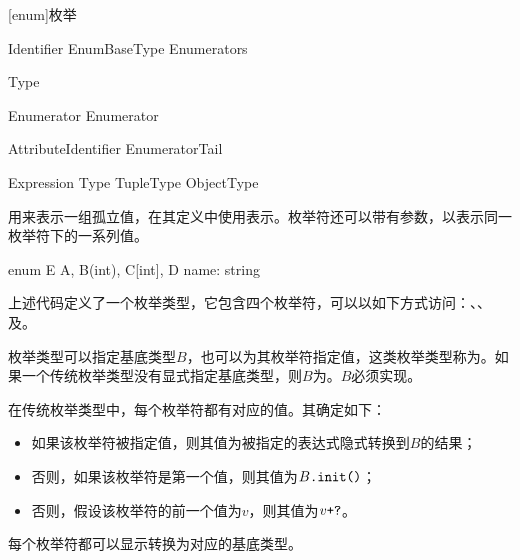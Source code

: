 
[enum]{枚举}

\begin{bnf}
 \br
     Identifier EnumBaseType\bnfq \terminal{\{} Enumerators \terminal{\}}
\end{bnf}

\begin{bnf}
 \br
    \terminal{:} Type
\end{bnf}

\begin{bnf}
 \br
    Enumerator \bnflp \terminal{,} Enumerator \bnfrp\bnfs \terminal{,}\bnfq
\end{bnf}

\begin{bnf}
 \br
    Attribute\bnfq Identifier EnumeratorTail\bnfq
\end{bnf}

\begin{bnf}
 \br
    \terminal{=} Expression \br
    \terminal{[} Type \terminal{]} \br
    TupleType \br
    ObjectType \br
\end{bnf}

\pnum
{}用来表示一组孤立值，在其定义中使用表示。枚举符还可以带有参数，以表示同一枚举符下的一系列值。

\enterexample
\begin{codeblock}

enum E {
    A,
    B(int),
    C[int],
    D{ name: string }
}

\end{codeblock}

上述代码定义了一个枚举类型，它包含四个枚举符，可以以如下方式访问：、、及。
\exitexample

\pnum
枚举类型可以指定基底类型$B$，也可以为其枚举符指定值，这类枚举类型称为。如果一个传统枚举类型没有显式指定基底类型，则$B$为。$B$必须实现。

\pnum
在传统枚举类型中，每个枚举符都有对应的值。其确定如下：

\begin{itemize}
    \item 如果该枚举符被指定值，则其值为被指定的表达式隐式转换到$B$的结果；
    \item 否则，如果该枚举符是第一个值，则其值为$B\texttt{.init()}$；
    \item 否则，假设该枚举符的前一个值为$v$，则其值为$v\texttt{+?}$。
\end{itemize}

每个枚举符都可以显示转换为对应的基底类型。